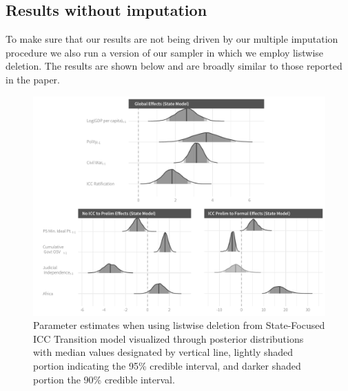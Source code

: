 \subsection*{Results without imputation}

To make sure that our results are not being driven by our multiple imputation procedure we also run a version of our sampler in which we employ listwise deletion. The results are shown below and are broadly similar to those reported in the paper.


\begin{figure}
    \centering
    \includegraphics[width=1\textwidth]{stateCoefSumm_noImp.pdf}
    \caption{Parameter estimates when using listwise deletion from State-Focused ICC Transition model visualized through posterior distributions with median values designated by vertical line, lightly shaded portion indicating the 95\% credible interval, and darker shaded portion the 90\% credible interval.}
    \label{fig:stateModel_noImp}
\end{figure}


